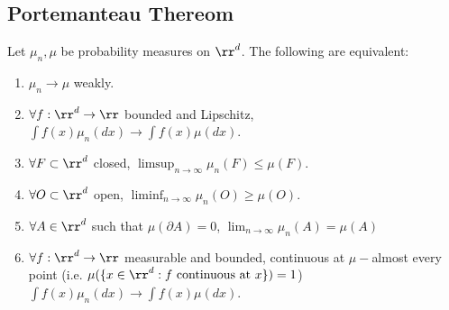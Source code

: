\documentclass[../main.tex]{subfiles}
\begin{document}
\subsection{Portemanteau Thereom}
\begin{theorem}
  Let $\mu_n, \mu$ be probability measures on $\rr^d$. The following are
  equivalent:
  \begin{enumerate}
    \item $\mu_n \to \mu$ weakly.
    \item $\forall f: \rr^d \to \rr $ bounded and Lipschitz, $\int f(x) \mu_n(dx)
      \to \int f(x) \mu(dx)$.
    \item $\forall F \subset \rr^d$ closed, $\limsup_{n \to \infty} \mu_n(F)
      \leq \mu(F)$.
    \item $\forall O \subset \rr^d$ open, $\liminf_{n \to \infty} \mu_n(O)
      \geq \mu(O)$.
    \item $\forall A \in \rr^d$ such that $\mu(\partial A) = 0$, $\lim_{n \to
      \infty}\mu_n(A) = \mu(A)$
    \item $\forall f:\rr^d \to \rr $ measurable and bounded, continuous at
      $\mu-$almost every point (i.e. $\mu(\{ x \in \rr^d : f \text{ continuous
      at } x \}) = 1 $) $\int f(x) \mu_n(dx)
      \to \int f(x) \mu(dx)$.
  \end{enumerate}
\end{theorem}
\end{document}
